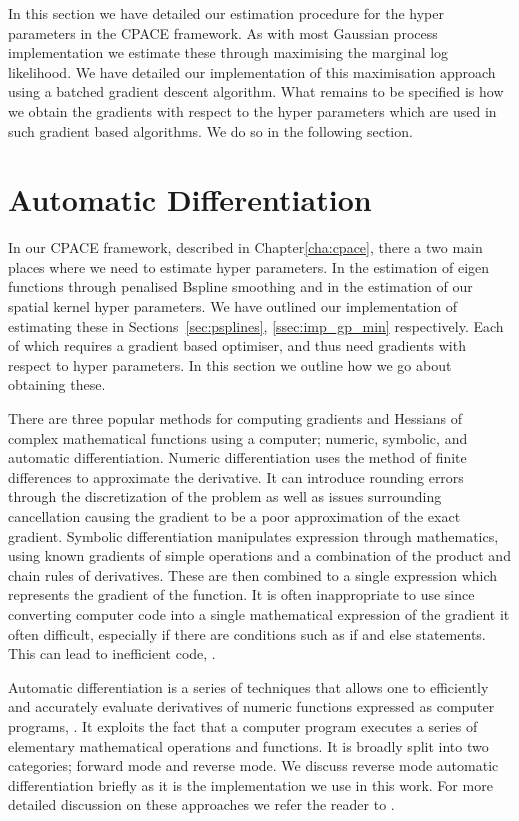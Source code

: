 In this section we have detailed our estimation procedure for the hyper parameters in the CPACE framework.
As with most Gaussian process implementation we estimate these through maximising the marginal log likelihood.
We have detailed our implementation of this maximisation approach using a batched gradient descent algorithm. 
What remains to be specified is how we obtain the gradients with respect to the hyper parameters which are used in such gradient based algorithms.
We do so in the following section.

\section{Automatic Differentiation \label{sec:auto_diff}}
In our CPACE framework, described in Chapter\ref{cha:cpace}, there a two main places where we need to estimate hyper parameters.
In the estimation of eigen functions through penalised Bspline smoothing and in the estimation of our spatial kernel hyper parameters.
We have outlined our implementation of estimating these in Sections~\ref{sec:psplines}, \ref{ssec:imp_gp_min} respectively.
Each of which requires a gradient based optimiser, and thus need gradients with respect to hyper parameters.
In this section we outline how we go about obtaining these.

There are three popular methods for computing gradients and Hessians of complex mathematical functions using a computer; numeric, symbolic, and automatic differentiation.
Numeric differentiation uses the method of finite differences to approximate the derivative.
It can introduce rounding errors through the discretization of the problem as well as issues surrounding cancellation causing the gradient to be a poor approximation of the exact gradient.
Symbolic differentiation manipulates expression through mathematics, using known gradients of simple operations and a combination of the product and chain rules of derivatives.
These are then combined to a single expression which represents the gradient of the function. 
It is often inappropriate to use since converting computer code into a single mathematical expression of the gradient it often difficult, especially if there are conditions such as if and else statements. 
This can lead to inefficient code, \citep{baydin_automatic_2018}.

Automatic differentiation is a series of techniques that allows one to efficiently and accurately evaluate derivatives of numeric functions expressed as computer programs, \citep{neidinger_introduction_2010}.
It exploits the fact that a computer program executes a series of elementary mathematical operations and functions.
It is broadly split into two categories; forward mode and reverse mode.
We discuss reverse mode automatic differentiation briefly as it is the implementation we use in this work.
For more detailed discussion on these approaches we refer the reader to \citep{neidinger_introduction_2010}.

